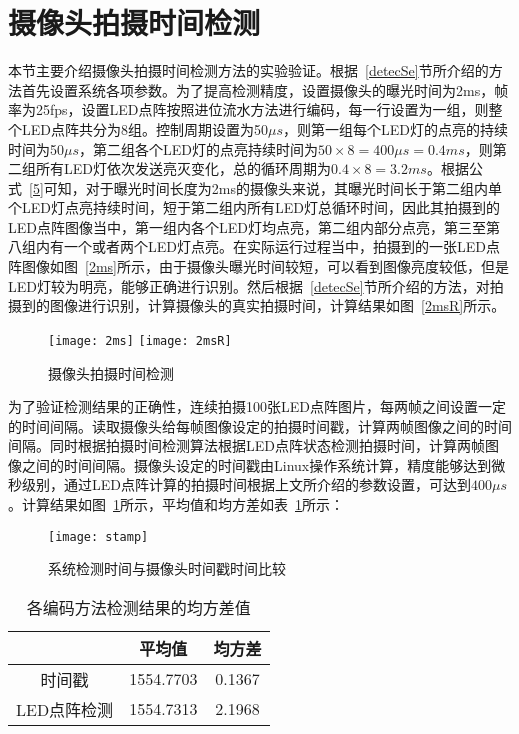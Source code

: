\section{摄像头拍摄时间检测}
\label{detSec}

本节主要介绍摄像头拍摄时间检测方法的实验验证。根据~\ref{detecSe}节所介绍的方法首先设置系统各项参数。为了提高检测精度，设置摄像头的曝光时间为2ms，帧率为25fps，设置LED点阵按照进位流水方法进行编码，每一行设置为一组，则整个LED点阵共分为8组。控制周期设置为50$\mu s$，则第一组每个LED灯的点亮的持续时间为50$\mu s$，第二组各个LED灯的点亮持续时间为$50 \times 8 = 400\mu s = 0.4ms$，则第二组所有LED灯依次发送亮灭变化，总的循环周期为$0.4 \times 8 = 3.2ms$。根据公式~\ref{5}可知，对于曝光时间长度为2ms的摄像头来说，其曝光时间长于第二组内单个LED灯点亮持续时间，短于第二组内所有LED灯总循环时间，因此其拍摄到的LED点阵图像当中，第一组内各个LED灯均点亮，第二组内部分点亮，第三至第八组内有一个或者两个LED灯点亮。在实际运行过程当中，拍摄到的一张LED点阵图像如图~\ref{2ms}所示，由于摄像头曝光时间较短，可以看到图像亮度较低，但是LED灯较为明亮，能够正确进行识别。然后根据~\ref{detecSe}节所介绍的方法，对拍摄到的图像进行识别，计算摄像头的真实拍摄时间，计算结果如图~\ref{2msR}所示。

\begin{figure}[h] 
  \centering%
    {\texttt{[image: 2ms]}}
      {\texttt{[image: 2msR]}}
  \caption{摄像头拍摄时间检测}
\end{figure}

为了验证检测结果的正确性，连续拍摄100张LED点阵图片，每两帧之间设置一定的时间间隔。读取摄像头给每帧图像设定的拍摄时间戳，计算两帧图像之间的时间间隔。同时根据拍摄时间检测算法根据LED点阵状态检测拍摄时间，计算两帧图像之间的时间间隔。摄像头设定的时间戳由Linux操作系统计算，精度能够达到微秒级别，通过LED点阵计算的拍摄时间根据上文所介绍的参数设置，可达到$400\mu s$。计算结果如图~\ref{stamp}所示，平均值和均方差如表~\ref{codingT}所示：

\begin{figure}[h] 
  \centering
  \texttt{[image: stamp]}
  \caption{系统检测时间与摄像头时间戳时间比较}
    \label{stamp}
\end{figure}

\begin{table}[h]
  \centering
  \caption{各编码方法检测结果的均方差值} 
  \label{codingT}
  \begin{tabular}{|c|c|c|}\hline
  &  平均值 &  均方差 \\ \hline 
  时间戳 & 1554.7703 &0.1367\\ \hline
  LED点阵检测 & 1554.7313 & 2.1968\\ \hline
  \end{tabular}
\end{table}

